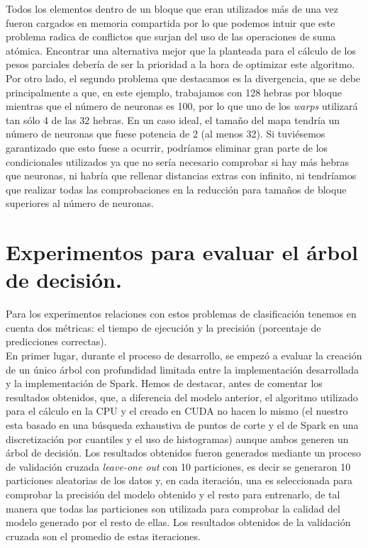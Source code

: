  Todos los elementos dentro de un bloque que eran utilizados más de una vez fueron cargados en memoria compartida por lo que podemos intuir que este problema radica de conflictos que surjan del uso de las operaciones de suma atómica. Encontrar una alternativa mejor que la planteada para el cálculo de los pesos parciales debería de ser la prioridad a la hora de optimizar este algoritmo. \\

 Por otro lado, el segundo problema que destacamos es la divergencia, que se debe principalmente a que, en este ejemplo, trabajamos con 128 hebras por bloque mientras que el número de neuronas es 100, por lo que uno de los \textit{warps} utilizará tan sólo 4 de las 32 hebras. En un caso ideal, el tamaño del mapa tendría un número de neuronas que fuese potencia de 2 (al menos 32). Si tuviésemos garantizado que esto fuese a ocurrir, podríamos eliminar gran parte de los condicionales utilizados ya que no sería necesario comprobar si hay más hebras que neuronas, ni habría que rellenar distancias extras con infinito, ni tendríamos que realizar todas las comprobaciones en la reducción para tamaños de bloque superiores al número de neuronas.

\newpage
\section{Experimentos para evaluar el árbol de decisión.}
Para los experimentos relaciones con estos problemas de clasificación tenemos en cuenta dos métricas: el tiempo de ejecución y la precisión (porcentaje de predicciones correctas).\\

En primer lugar, durante el proceso de desarrollo, se empezó a evaluar la creación de un único árbol con profundidad limitada entre la implementación desarrollada y la implementación de Spark. Hemos de destacar, antes de comentar los resultados obtenidos, que, a diferencia del modelo anterior, el algoritmo utilizado para el cálculo en la CPU y el creado en CUDA no hacen lo mismo (el nuestro esta basado en una búsqueda exhaustiva de puntos de corte y el de Spark en una discretización por cuantiles y el uso de histogramas) aunque ambos generen un árbol de decisión. Los resultados obtenidos fueron generados mediante un proceso de validación cruzada \textit{leave-one out} con 10 particiones, es decir se generaron 10 particiones aleatorias de los datos y, en cada iteración, una es seleccionada para comprobar la precisión del modelo obtenido y el resto para entrenarlo, de tal manera que todas las particiones son utilizada para comprobar la calidad del modelo generado por el resto de ellas. Los resultados obtenidos de la validación cruzada son el promedio de estas iteraciones.
\newpage
